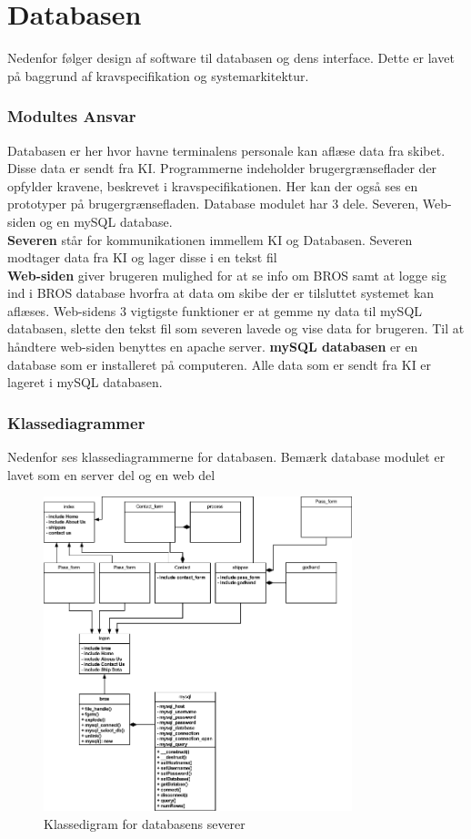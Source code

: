 \chapter{Databasen}
Nedenfor følger design af software til databasen og dens interface. Dette er lavet på baggrund af kravspecifikation og systemarkitektur. 

\subsection{Modultes Ansvar}
Databasen er her hvor havne terminalens personale kan aflæse data fra skibet. Disse data er sendt fra KI. Programmerne indeholder brugergrænseflader der opfylder kravene, beskrevet i kravspecifikationen. Her kan der også ses en prototyper på brugergrænsefladen.
Database modulet har 3 dele. Severen, Web-siden og en mySQL database. \\
\textbf{Severen} står for kommunikationen immellem KI og Databasen. Severen modtager data fra KI og lager disse i en tekst fil\\
\textbf{Web-siden} giver brugeren mulighed for at se info om BROS samt at logge sig ind i BROS database hvorfra at data om skibe der er tilsluttet systemet kan aflæses. Web-sidens 3 vigtigste funktioner er at gemme ny data til mySQL databasen, slette den tekst fil som severen lavede og vise data for brugeren. Til at håndtere web-siden benyttes en apache server.
\textbf{mySQL databasen} er en database som er  installeret på computeren. Alle data som er sendt fra KI er lageret i mySQL databasen.

\subsection{Klassediagrammer}
Nedenfor ses klassediagrammerne for databasen. Bemærk database modulet er lavet som en server del og en web del
\begin{figure}[H]
	\centering
	\includegraphics[width=0.8\textwidth]{billeder/web_klasse}
	\caption{Klassedigram for databasens severer}
	\label{fig:serverKlassediagram}
\end{figure}

